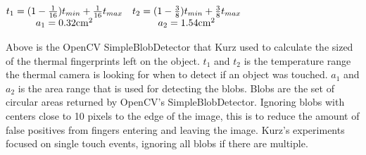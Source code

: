 \documentclass{sig-alternate}
\begin{document}
\(
\begin{matrix}
 t_{1}=(1-{1\over 16})t_{ min}+{1\over 16}t_{ max} & t_{2}=(1-{3\over 8})t_{ min}+{3\over 8}t_{ max}\cr a_{1}=0.32{\rm cm}^{2} & a_{2}=1.54{\rm cm}^{2}
 \end{matrix}
\)

Above is the OpenCV SimpleBlobDetector that Kurz used to calculate the sized of the thermal fingerprints left on the object. \(t_1\) and \(t_2\) is the temperature range the thermal camera is looking for when to detect if an object was touched. \(a_1\) and \(a_2\) is the area range that is used for detecting the blobs. Blobs are the set of circular areas returned by OpenCV's SimpleBlobDetector. Ignoring blobs with centers close to 10 pixels to the edge of the image, this is to reduce the amount of false positives from fingers entering and leaving the image. Kurz's experiments focused on single touch events, ignoring all blobs if there are multiple.        
\end{document}
